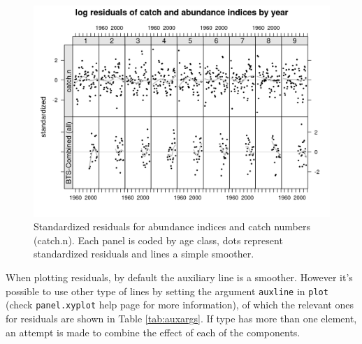 \documentclass[
]{book}
\begin{document}
\begin{figure}
\centering
\includegraphics{_bookdown_files/_main_files/figure-html/res-1.png}
\caption{\label{fig:res}Standardized residuals for abundance indices and catch numbers (catch.n). Each panel is coded by age class, dots represent standardized residuals and lines a simple smoother.}
\end{figure}

When plotting residuals, by default the auxiliary line is a smoother. However it's possible to use other type of lines by setting the argument \texttt{auxline} in \texttt{plot} (check \texttt{panel.xyplot} help page for more information), of which the relevant ones for residuals are shown in Table \ref{tab:auxargs}. If type has more than one element, an attempt is made to combine the effect of each of the components.
\end{document}
